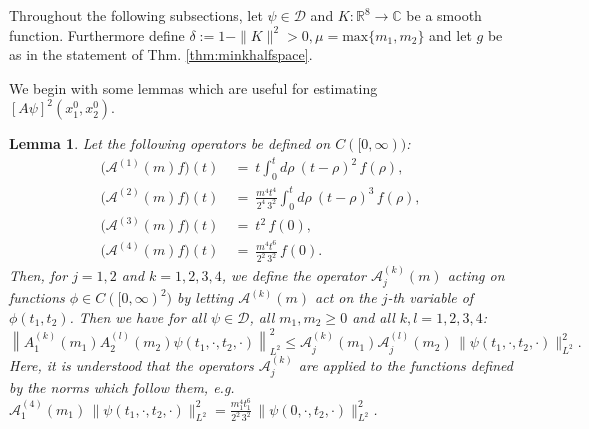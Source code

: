 \documentclass[b5paper,draft,openbib,12pt]{memoir}
\newtheorem{Lemma}[Def]{Lemma}
\newcommand{\R}{\mathbb{R}}
\newcommand{\CC}{\mathbb{C}}
\begin{document}
Throughout the following subsections, let $\psi \in \mathscr{D}$ and 
$K : \R^8 \rightarrow \CC$ be a smooth function. Furthermore define 
\(\delta:= 1-\|K\|^2>0, \mu=\text{max}\{m_1,m_2\}\) and let \(g\) 
be as in the statement of Thm. \ref{thm:minkhalfspace}.

We begin with some lemmas which are useful for estimating \\
$[A\psi]^2(x_1^0,x_2^0)$.

\begin{Lemma} \label{thm:estimatetensoroperators}
	Let the following operators be defined on $C([0,\infty))$:
	\begin{align}
		\big(\mathcal{A}^{(1)}(m) f\big)(t) ~&=~ t \int_0^{t} d \rho ~ (t-\rho)^2\,  f(\rho),\nonumber\\
		\big(\mathcal{A}^{(2)}(m) f \big)(t) ~&=~ \frac{m^4 t^4}{2^4 \,3^2} \int_0^{t} d\rho ~(t-\rho)^3 \, f(\rho),\nonumber\\
		\big(\mathcal{A}^{(3)}(m) f\big)(t) ~&=~ t^2 \, f(0),\nonumber\\
		\big(\mathcal{A}^{(4)}(m) f \big)(t) ~&=~ \frac{m^4 t^6}{2^2\, 3^2} \, f(0).
	\label{eq:defcurlyoperators}
	\end{align}
  Then, for $j=1,2$ and $k=1,2,3,4$, we define the operator 
  $\mathcal{A}_j^{(k)}(m)$ acting on functions 
  $\phi \in C([0,\infty)^2)$ by letting $\mathcal{A}^{(k)}(m)$ act 
  on the $j$-th variable of $\phi(t_1,t_2)$.
Then we have for all $\psi \in \mathscr{D}$, all $m_1,m_2\geq 0$ and 
all $k,l=1,2,3,4$:
\begin{equation}
		\left\| A_1^{(k)}(m_1) A_2^{(l)}(m_2)  \psi(t_1,\cdot,t_2,\cdot) \right\|^2_{L^2} \!\!\leq\! \mathcal{A}_j^{(k)}(m_1) \mathcal{A}_j^{(l)}(m_2)\, \|\psi(t_1,\cdot,t_2,\cdot)\|^2_{L^2}.\label{eq:aestimate}
	\end{equation}
Here, it is understood that the operators $\mathcal{A}_j^{(k)}$ 
are applied to the functions defined by the norms which follow them, 
e.g.\, \\
$\mathcal{A}_1^{(4)}(m_1)\, \|\psi(t_1,\cdot,t_2,\cdot)\|^2_{L^2} = \frac{m^4_1 t_1^6}{2^2\, 3^2} \, \|\psi(0,\cdot,t_2,\cdot)\|^2_{L^2}$.
\end{Lemma}
\end{document}
